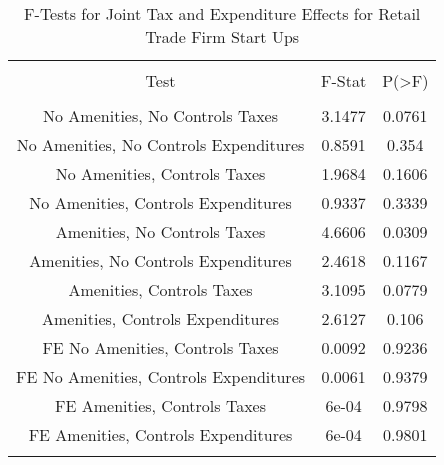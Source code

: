 
\begin{table}[!htbp] \centering 
  \caption{F-Tests for Joint Tax and Expenditure Effects for Retail Trade Firm Start Ups} 
  \label{44-45Ftests} 
\begin{tabular}{@{\extracolsep{5pt}} ccc} 
\\[-1.8ex]\hline 
\hline \\[-1.8ex] 
Test & F-Stat & P(\textgreater F) \\ 
\hline \\[-1.8ex] 
No Amenities, No Controls Taxes & 3.1477 & 0.0761 \\ 
No Amenities, No Controls Expenditures & 0.8591 & 0.354 \\ 
No Amenities, Controls Taxes & 1.9684 & 0.1606 \\ 
No Amenities, Controls Expenditures & 0.9337 & 0.3339 \\ 
Amenities, No Controls Taxes & 4.6606 & 0.0309 \\ 
Amenities, No Controls Expenditures & 2.4618 & 0.1167 \\ 
Amenities, Controls Taxes & 3.1095 & 0.0779 \\ 
Amenities, Controls Expenditures & 2.6127 & 0.106 \\ 
FE No Amenities, Controls Taxes & 0.0092 & 0.9236 \\ 
FE No Amenities, Controls Expenditures & 0.0061 & 0.9379 \\ 
FE Amenities, Controls Taxes & 6e-04 & 0.9798 \\ 
FE Amenities, Controls Expenditures & 6e-04 & 0.9801 \\ 
\hline \\[-1.8ex] 
\end{tabular} 
\end{table} 
